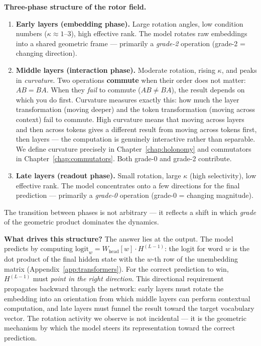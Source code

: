 \documentclass[11pt, twoside, openright]{memoir}
\numberwithin{equation}{chapter}
\begin{document}
\begin{gabox}
\textbf{Three-phase structure of the rotor field.}
\begin{enumerate}[nosep]
\item \textbf{Early layers (embedding phase).}  Large rotation angles,
  low condition numbers ($\kappa \approx 1$--$3$), high effective rank.
  The model rotates raw embeddings into a shared geometric frame ---
  primarily a \emph{grade-2} operation (grade-2 = changing direction).
\item \textbf{Middle layers (interaction phase).}  Moderate rotation,
  rising $\kappa$, and peaks in \emph{curvature}.  Two operations
  \textbf{commute} when their order does not matter: $AB = BA$.
  When they \emph{fail} to commute ($AB \neq BA$), the result depends
  on which you do first.  Curvature measures exactly this: how much
  the layer transformation (moving deeper) and the token transformation
  (moving across context) fail to commute.  High curvature means that
  moving across layers and then across tokens gives a different result
  from moving across tokens first, then layers --- the computation is
  genuinely interactive rather than separable.  We define curvature
  precisely in Chapter~\ref{chap:holonomy} and commutators in
  Chapter~\ref{chap:commutators}.
  Both grade-0 and grade-2 contribute.
\item \textbf{Late layers (readout phase).}  Small rotation, large
  $\kappa$ (high selectivity), low effective rank.  The model
  concentrates onto a few directions for the final prediction ---
  primarily a \emph{grade-0} operation (grade-0 = changing magnitude).
\end{enumerate}
\end{gabox}

The transition between phases is not arbitrary --- it reflects a shift
in which \emph{grade} of the geometric product dominates the dynamics.

\textbf{What drives this structure?}  The answer lies at the output.
The model predicts by computing $\mathrm{logit}_w = W_{\mathrm{head}}[w] \cdot H^{(L-1)}$:
the logit for word $w$ is the dot product of the final hidden state with
the $w$-th row of the unembedding matrix (Appendix~\ref{app:transformers}).
For the correct prediction to win, $H^{(L-1)}$ must \emph{point in the
right direction}.  This directional requirement propagates backward
through the network: early layers must rotate the embedding into an
orientation from which middle layers can perform contextual computation,
and late layers must funnel the result toward the target vocabulary
vector.  The rotation activity we observe is not incidental --- it is the
geometric mechanism by which the model steers its representation toward
the correct prediction.
\end{document}
